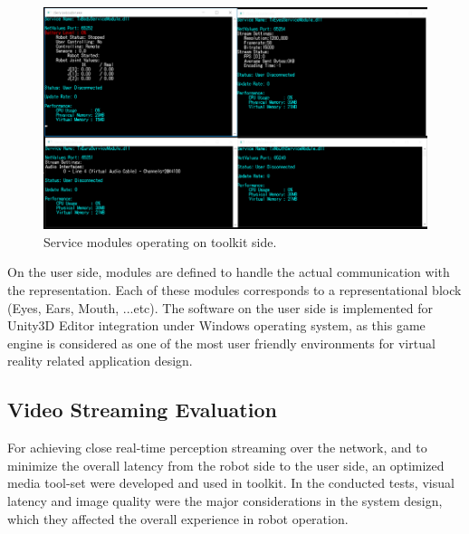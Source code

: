 \begin{figure}[htpb]
\centering
  \captionsetup{justification=centering}
\includegraphics[width=1\textwidth]{figures/system/Services.png}
\caption{Service modules operating on toolkit side.}
  \label{fig:system-txkit-services}
\end{figure}

On the user side, modules are defined to handle the actual communication with the representation. Each of these modules corresponds to a representational block (Eyes, Ears, Mouth, ...etc). The software on the user side is implemented for Unity3D Editor integration under Windows operating system, as this game engine is considered as one of the most user friendly environments for virtual reality related application design.





\subsection{Video Streaming Evaluation}
For achieving close real-time perception streaming over the network, and to minimize the overall latency from the robot side to the user side, an optimized media tool-set were developed and used in toolkit. In the conducted tests, visual latency and image quality were the major considerations in the system design, which they affected the overall experience in robot operation. 

